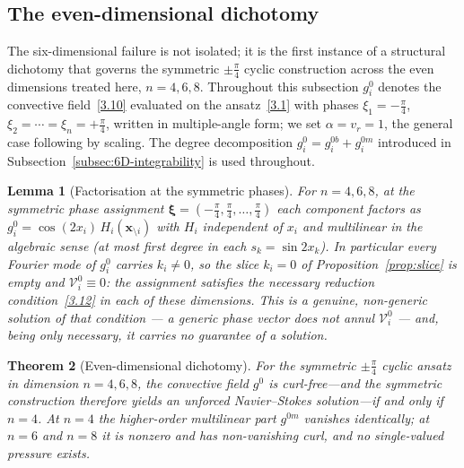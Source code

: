 \documentclass[11pt]{jfm}
\newtheorem{lemma}{Lemma}[section]
\newtheorem{theorem}[lemma]{Theorem}
\numberwithin{equation}{section}
\begin{document}
\subsection{The even-dimensional dichotomy}
\label{subsec:even-dichotomy}
The six-dimensional failure is not isolated; it is the first instance of a structural
dichotomy that governs the symmetric $\pm\tfrac{\pi}{4}$ cyclic construction across the even
dimensions treated here, $n=4,6,8$. Throughout this subsection $g_i^0$ denotes the convective field~\eqref{3.10}
evaluated on the ansatz~\eqref{3.1} with phases $\xi_1=-\tfrac{\pi}{4}$,
$\xi_2=\cdots=\xi_n=+\tfrac{\pi}{4}$, written in multiple-angle form; we set $\alpha=v_r=1$,
the general case following by scaling. The degree decomposition $g_i^0=g_i^{0b}+g_i^{0m}$ introduced in
Subsection~\ref{subsec:6D-integrability} is used throughout.

\begin{lemma}[Factorisation at the symmetric phases]
\label{lem:even-Vi}
For $n=4,6,8$, at the symmetric phase assignment
$\boldsymbol{\xi}=(-\tfrac{\pi}{4},\tfrac{\pi}{4},\dots,\tfrac{\pi}{4})$ each component factors as
$g_i^0 = \cos(2 x_i)\,H_i(\boldsymbol{x}_{\setminus i})$ with $H_i$ independent of $x_i$ and
multilinear in the algebraic sense (at most first degree in each $s_k=\sin 2x_k$). In particular every Fourier mode of $g_i^0$
carries $k_i\neq0$, so the slice $k_i=0$ of Proposition~\ref{prop:slice} is empty and
$\mathcal{V}_i^0\equiv 0$: the assignment satisfies the necessary reduction condition~\eqref{3.12}
in each of these dimensions. This is a genuine, non-generic solution of that condition --- a generic
phase vector does not annul $\mathcal{V}_i^0$ --- and, being only necessary, it carries no
guarantee of a solution.
\end{lemma}

\begin{theorem}[Even-dimensional dichotomy]
\label{thm:even-dichotomy}
For the symmetric $\pm\tfrac{\pi}{4}$ cyclic ansatz in dimension $n=4,6,8$, the convective field $g^0$ is curl-free---and the symmetric construction therefore yields an unforced Navier--Stokes solution---if and only if $n=4$. At $n=4$ the higher-order multilinear part $g^{0m}$
vanishes identically; at $n=6$ and $n=8$ it is nonzero and has non-vanishing curl, and
no single-valued pressure exists.
\end{theorem}
\end{document}
